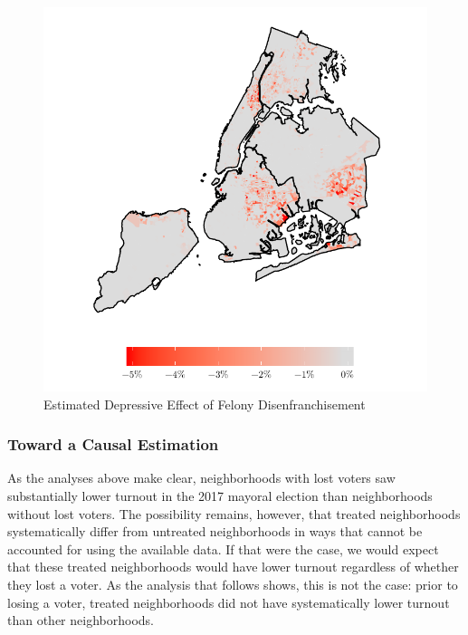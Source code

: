 \documentclass[12pt,]{article}
\begin{document}
\begin{figure}[H]

{\centering \includegraphics{felony_disenfranchisement_nys_files/figure-latex/postest-map-1} 

}

\caption{\label{fig:postest}Estimated Depressive Effect of Felony Disenfranchisement}\label{fig:postest-map}
\end{figure}

\hypertarget{toward-a-causal-estimation}{%
\subsubsection*{Toward a Causal Estimation}\label{toward-a-causal-estimation}}

As the analyses above make clear, neighborhoods with lost voters saw substantially lower turnout in the 2017 mayoral election than neighborhoods without lost voters. The possibility remains, however, that treated neighborhoods systematically differ from untreated neighborhoods in ways that cannot be accounted for using the available data. If that were the case, we would expect that these treated neighborhoods would have lower turnout regardless of whether they lost a voter. As the analysis that follows shows, this is not the case: prior to losing a voter, treated neighborhoods did not have systematically lower turnout than other neighborhoods.
\end{document}
